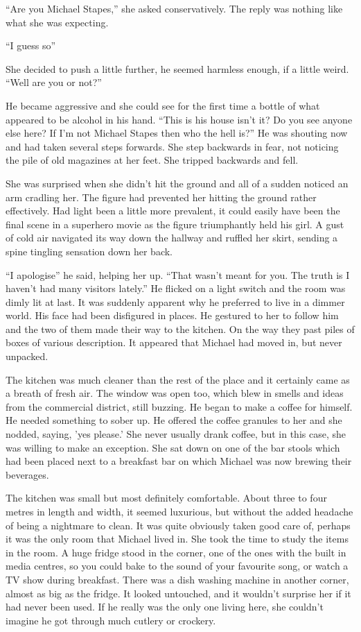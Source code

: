 ``Are you Michael Stapes,'' she asked conservatively.  The reply was nothing like what she was expecting.

``I guess so''

She decided to push a little further, he seemed harmless enough, if a little weird.  ``Well are you or not?''

He became aggressive and she could see for the first time a bottle of what appeared to be alcohol in his hand.  ``This is his house isn't it?  Do you see anyone else here?  If I'm not Michael Stapes then who the hell is?''  He was shouting now and had taken several steps forwards.  She step backwards in fear, not noticing the pile of old magazines at her feet.  She tripped backwards and fell.

She was surprised when she didn't hit the ground and all of a sudden noticed an arm cradling her.  The figure had prevented her hitting the ground rather effectively.  Had light been a little more prevalent, it could easily have been the final scene in a superhero movie as the figure triumphantly held his girl.  A gust of cold air navigated its way down the hallway and ruffled her skirt, sending a spine tingling sensation down her back.  

``I apologise'' he said, helping her up.  ``That wasn't meant for you.  The truth is I haven't had many visitors lately.''  He flicked on a light switch and the room was dimly lit at last.  It was suddenly apparent why he preferred to live in a dimmer world.  His face had been disfigured in places.  He gestured to her to follow him and the two of them made their way to the kitchen.  On the way they past piles of boxes of various description.  It appeared that Michael had moved in, but never unpacked.

The kitchen was much cleaner than the rest of the place and it certainly came as a breath of fresh air.  The window was open too, which blew in smells and ideas from the commercial district, still buzzing.  He began to make a coffee for himself.  He needed something to sober up.  He offered the coffee granules to her and she nodded, saying, 'yes please.'  She never usually drank coffee,  but in this case, she was willing to make an exception.  She sat down on one of the bar stools which had been placed next to a breakfast bar on which Michael was now brewing their beverages.

The kitchen was small but most definitely comfortable.  About three to four metres in length and width, it seemed luxurious, but without the added headache of being a nightmare to clean.  It was quite obviously taken good care of, perhaps it was the only room that Michael lived in.  She took the time to study the items in the room.  A huge fridge stood in the corner, one of the ones with the built in media centres, so you could bake to the sound of your favourite song, or watch a TV show during breakfast.  There was a dish washing machine in another corner, almost as big as the fridge.  It looked untouched, and it wouldn't surprise her if it had never been used.  If he really was the only one living here, she couldn't imagine he got through much cutlery or crockery.  


